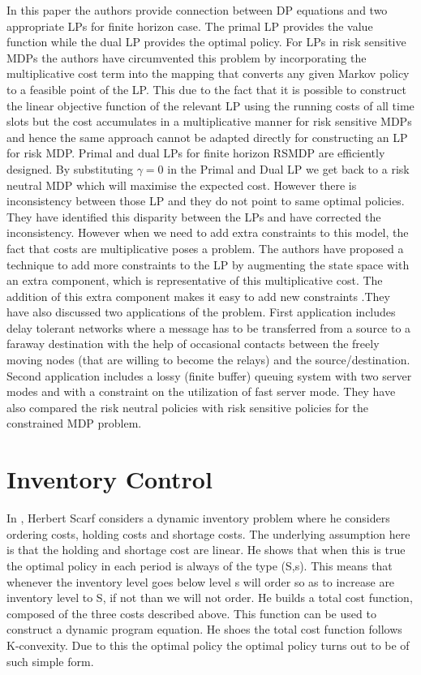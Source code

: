 \documentclass[12pt,a4paper,oneside]{report}
\begin{document}
In this paper the authors provide connection between DP equations and two appropriate LPs for finite horizon case. The primal LP provides the value function while the dual LP provides the optimal policy. For LPs in risk sensitive MDPs the authors have circumvented this problem by incorporating the multiplicative cost term into the mapping that converts any given Markov policy to a feasible point of the LP. This due to the fact that it is possible to construct the linear objective function of the relevant LP using the running costs of all time slots but the cost accumulates in a multiplicative manner for risk sensitive MDPs and hence the same approach cannot be adapted directly for constructing an LP for risk MDP. Primal and dual LPs for finite horizon RSMDP are efficiently designed.  By substituting $\gamma=0$ in the Primal and Dual LP we get back to a risk neutral MDP which will maximise the expected cost. However there is inconsistency between those LP and they do not point to same optimal policies. They have identified this disparity between the LPs and have corrected the inconsistency. However when we need to add extra constraints to this model, the fact that costs are multiplicative poses a problem. The authors have proposed a technique to add more constraints to the LP by augmenting the state space with an extra component, which is representative of this multiplicative cost. The addition of this extra component makes it easy to add new constraints .They have also discussed two applications of the problem. First application includes delay tolerant networks where a message has to be transferred from a source to a faraway destination with the help of occasional contacts between the freely moving nodes (that are willing to become the relays) and the source/destination. Second application includes a lossy (finite buffer) queuing system with two server modes and with a constraint on the utilization of fast server mode. They have also compared the risk neutral policies with risk sensitive policies for the constrained MDP problem.\\

\section{Inventory Control}
In \cite{scarf1959optimality}, Herbert Scarf considers a dynamic inventory problem where he considers ordering costs, holding costs and shortage costs. The underlying assumption here is that the holding and shortage cost are linear. He shows that when this is true the optimal policy in each period is always of the type (S,s). This means that whenever the inventory level goes below level s will order so as to increase are inventory level to S, if not than we will not order. He builds a total cost function, composed of the three costs described above. This function can be used to construct a dynamic program equation. He shoes the total cost function follows K-convexity. Due to this the optimal policy the optimal policy turns out to be of such simple form.\\
\end{document}
